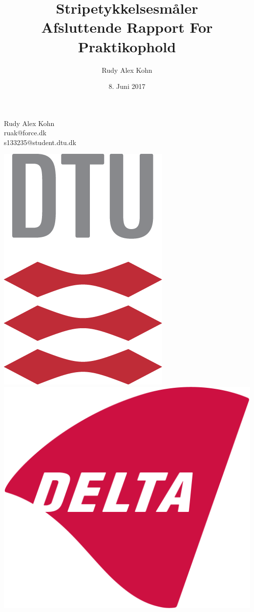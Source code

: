 \documentclass[11pt,a4paper,danish]{article}
\title{Stripetykkelsesmåler\\Afsluttende Rapport For Praktikophold}
\author{Rudy Alex Kohn}
\date{8. Juni 2017}
\begin{document}
\maketitle
\renewcommand{\contentsname}{Indeks}
\renewcommand{\listfigurename}{Figurliste}
\renewcommand{\figurename}{Figur}
\renewcommand\refname{Referencer}

\begin{center}
Rudy Alex Kohn\\
ruak@force.dk\\
s133235@student.dtu.dk
\end{center}

\vspace{25mm}

\begin{center}
\includegraphics[scale=0.3]{Billeder/kunlogo.png}
\includegraphics[scale=0.15]{Billeder/DELTA_1024px.png}
\end{center}
\end{document}
